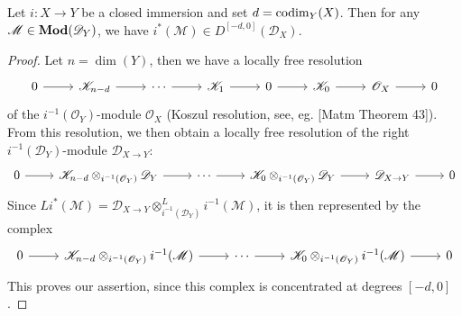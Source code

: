 \begin{proposition}\label{D-module derived inverse image of closed immersion}
Let $i:X\to Y$ be a closed immersion and set $d=\mathrm{codim}_Y(X)$. Then for any $\mathscr{M}\in\mathbf{Mod}(\mathscr{D}_Y)$, we have $i^*(\mathscr{M})\in D^{[-d,0]}(\mathscr{D}_X)$.
\end{proposition}
\begin{proof}
Let $n=\dim(Y)$, then we have a locally free resolution 
\begin{equation}\label{D-module derived inverse image of closed immersion-1}
\begin{aligned}
\begin{tikzcd}
0\ar[r]&\mathscr{K}_{n-d}\ar[r]&\cdots\ar[r]&\mathscr{K}_1\ar[r]&0\ar[r]&\mathscr{K}_0\ar[r]&\mathscr{O}_X\ar[r]&0
\end{tikzcd}
\end{aligned}
\end{equation}
of the $i^{-1}(\mathscr{O}_Y)$-module $\mathscr{O}_X$ (Koszul resolution, see, eg. [Matm Theorem 43]). From this resolution, we then obtain a locally free resolution of the right $i^{-1}(\mathscr{D}_Y)$-module $\mathscr{D}_{X\to Y}$:
\[\begin{tikzcd}
0\ar[r]&\mathscr{K}_{n-d}\otimes_{i^{-1}(\mathscr{O}_Y)}\mathscr{D}_Y\ar[r]&\cdots\ar[r]&\mathscr{K}_0\otimes_{i^{-1}(\mathscr{O}_Y)}\mathscr{D}_Y\ar[r]&\mathscr{D}_{X\to Y}\ar[r]&0
\end{tikzcd}\]
Since $Li^*(\mathscr{M})=\mathscr{D}_{X\to Y}\otimes_{i^{-1}(\mathscr{D}_Y)}^Li^{-1}(\mathscr{M})$, it is then represented by the complex
\[\begin{tikzcd}
0\ar[r]&\mathscr{K}_{n-d}\otimes_{i^{-1}(\mathscr{O}_Y)}i^{-1}(\mathscr{M})\ar[r]&\cdots\ar[r]&\mathscr{K}_0\otimes_{i^{-1}(\mathscr{O}_Y)}i^{-1}(\mathscr{M})\ar[r]&0
\end{tikzcd}\]
This proves our assertion, since this complex is concentrated at degrees $[-d,0]$.
\end{proof}


